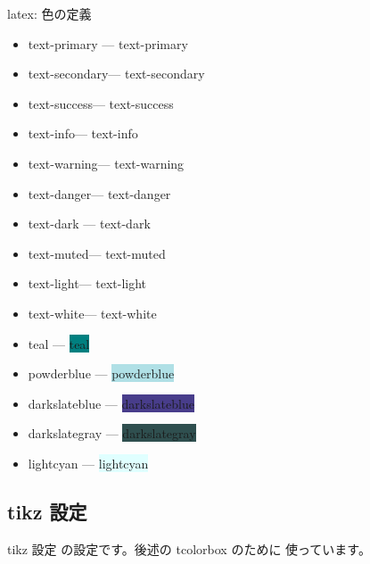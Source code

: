 \documentclass[dvipdfmx,a4j,14pt,uplatex,openany]{jsbook}
\begin{document}
\begin{programlist}[label={org794f667}]{latex}{: 色の定義}%

\end{programlist}


\begin{itemize}
\item text-primary --- \colorbox{text-primary}{text-primary}
\item text-secondary--- \colorbox{text-secondary}{text-secondary}
\item text-success--- \colorbox{text-success}{text-success}
\item text-info--- \colorbox{text-info}{text-info}
\item text-warning--- \colorbox{text-warning}{text-warning}
\item text-danger--- \colorbox{text-danger}{text-danger}
\item text-dark --- \colorbox{text-dark}{text-dark}
\item text-muted--- \colorbox{text-muted}{text-muted}
\item text-light--- \colorbox{text-light}{text-light}
\item text-white--- \colorbox{text-white}{text-white}
\item teal        --- \colorbox{teal}{teal}
\item powderblue  --- \colorbox{powderblue}{powderblue}
\item darkslateblue  --- \colorbox{darkslateblue}{darkslateblue}
\item darkslategray  --- \colorbox{darkslategray}{darkslategray}
\item lightcyan  --- \colorbox{lightcyan}{lightcyan}
\end{itemize}

\subsection{tikz 設定}
\label{sec:orgc547dac}
tikz 設定 の設定です。後述の tcolorbox のために
使っています。
\end{document}
